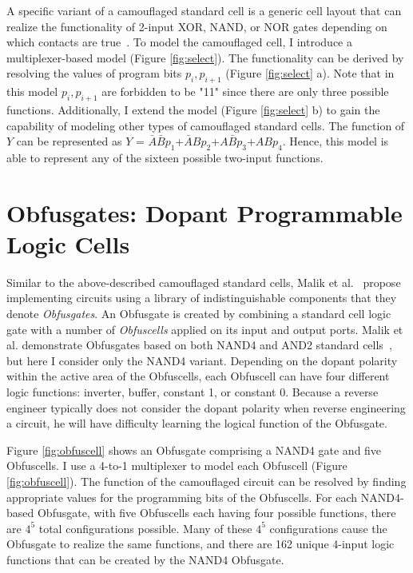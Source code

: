\documentclass[proposal]{umassthesis}  %
\begin{document}
A specific variant of a camouflaged standard cell is a generic cell layout that can realize the functionality of 2-input XOR, NAND, or NOR gates depending on which contacts are true~\cite{rajendran-13}. To model the camouflaged cell, I introduce a multiplexer-based model (Figure \ref{fig:select}). The functionality can be derived by resolving the values of program bits $p_{i},p_{i+1}$ (Figure \ref{fig:select} a). Note that in this model $p_{i},p_{i+1}$ are forbidden to be "11" since there are only three possible functions. Additionally, I extend the model (Figure \ref{fig:select} b) to gain the capability of modeling other types of camouflaged standard cells. The function of $Y$ can be represented as $Y$ = $\bar{A}\bar{B}p_{1}$+$\bar{A}Bp_{2}$+$A\bar{B}p_{3}$+$ABp_{4}$. Hence, this model is able to represent any of the sixteen possible two-input functions. 


















\section{Obfusgates: Dopant Programmable Logic Cells}

Similar to the above-described camouflaged standard cells, Malik et al.~\cite{malik-obfusgate} propose implementing circuits using a library of indistinguishable components that they denote \textit{Obfusgates}. An Obfusgate is created by combining a standard cell logic gate with a number of \textit{Obfuscells} applied on its input and output ports. Malik et al. demonstrate Obfusgates based on both NAND4 and AND2 standard cells~\cite{malik-obfusgate}, but here I consider only the NAND4 variant. Depending on the dopant polarity within the active area of the Obfuscells, each Obfuscell can have four different logic functions: inverter, buffer, constant 1, or constant 0. Because a reverse engineer typically does not consider the dopant polarity when reverse engineering a circuit, he will have difficulty learning the logical function of the Obfusgate.

Figure \ref{fig:obfuscell} shows an Obfusgate comprising a NAND4 gate and five Obfuscells. I use a 4-to-1 multiplexer to model each Obfuscell (Figure \ref{fig:obfuscell}). The function of the camouflaged circuit can be resolved by finding appropriate values for the programming bits of the Obfuscells. For each NAND4-based Obfusgate, with five Obfuscells each having four possible functions, there are $4^{5}$ total configurations possible. Many of these $4^{5}$ configurations cause the Obfusgate to realize the same functions, and there are 162 unique 4-input logic functions that can be created by the NAND4 Obfusgate.
\end{document}

